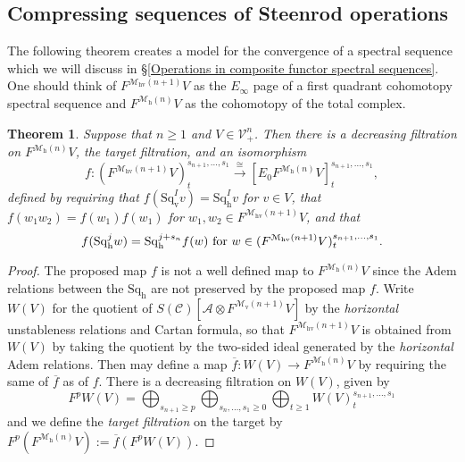 \documentclass[11pt]{amsart} \renewcommand{\baselinestretch}{1.4}
\theoremstyle{plain}
\newtheorem{thm}{Theorem}[section]
\theoremstyle{definition}
\renewcommand{\to}{\longrightarrow}
\newcommand{\scrC}{\mathscr{C}}
\newcommand{\calA}{\mathcal{A}}
\newcommand{\calV}{\mathcal{V}}
\newcommand{\calMv}{\mathcal{M}\dver}
\newcommand{\calMh}{\mathcal{M}\dhor}
\newcommand{\calMhv}{\mathcal{M}_\mathrm{hv}}
\newcommand{\CommOperad}{{\scrC}}
\newcommand{\vect}[2]{\calV^{#1}_{#2}}
\newcommand{\LieSteen}{\calA}
\newcommand{\Edown}[4]{[E_{#1}#2]^{#3}_{#4}}
\newcommand{\dver}{_\mathrm{v}}
\newcommand{\dhor}{_\mathrm{h}}
\newcommand{\Sqh}{\mathrm{Sq}\dhor}
\newcommand{\Sqv}{\mathrm{Sq}\dver}
\begin{document}
\begin{Cohomology Operations for W and U}
\subsection{Compressing sequences of Steenrod operations}
The following theorem creates a model for the convergence of a spectral sequence which we will discuss in \S\ref{Operations in composite functor spectral sequences}. One should think of $F^{\calMhv(n+1)}V$ as the $E_\infty$ page of  a first quadrant cohomotopy spectral sequence and $F^{\calMh(n)}V$ as the cohomotopy of the total complex.
\begin{thm}
\label{thm on compressing seqs of steenrod ops}
Suppose that $n\geq1$ and $V\in \vect{n}{+}$. Then there is a decreasing filtration on $F^{\calMh(n)}V$, the \emph{target filtration}, and an isomorphism
\[ f:(F^{\calMhv(n+1)}V)^{s_{n+1},\ldots,s_1}_t\overset{\cong}{\to} \Edown{0}{F^{\calMh(n)}V}{s_{n+1},\ldots,s_1}{t},\]
defined by requiring that
$f(\Sqv^Iv)=\Sqh^Iv$ for $v\in V$, that $f(w_1w_2)=f(w_1)f(w_1)$ for $w_1,w_2\in F^{\calMhv(n+1)}V$,
and that
\[f(\Sqh^jw)=\Sqh^{j+s_n}f(w)\textup{ for }w\in (F^{\calMhv(n+1)}V)^{s_{n+1},\ldots,s_1}_t.\]
\end{thm}
\begin{proof}
The proposed map $f$ is not a well defined map to $F^{\calMh(n)}V$ since the Adem relations between the $\Sqh$ are not preserved by the proposed map $f$. Write $W(V)$ for the quotient of $S(\CommOperad)[\LieSteen\otimes F^{\calMv(n+1)}V]$ by the \emph{horizontal} unstableness relations and Cartan formula, so that $F^{\calMhv(n+1)}V$ is obtained from $W(V)$ by taking the quotient by the two-sided ideal generated by the \emph{horizontal} Adem relations. Then may define a map $\overline{f}:W(V)\to F^{\calMh(n)}V$ by requiring the same of $\overline{f}$ as of $f$. There is a decreasing filtration on $W(V)$, given by 
\[F^pW(V)=\bigoplus_{s_{n+1}\geq p}\bigoplus_{s_n,\ldots,s_1\geq0}\bigoplus_{t\geq1}W(V)^{s_{n+1},\ldots,s_1}_t\]
 and we define the \emph{target filtration} on the target by $F^p(F^{\calMh(n)}V):=\overline{f}(F^pW(V))$.


\end{proof}
\end{Cohomology Operations for W and U}
\end{document}
